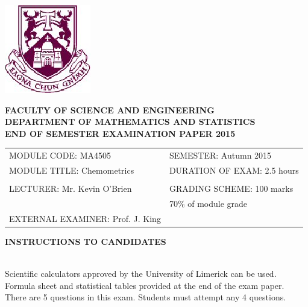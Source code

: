 \documentclass[a4paper,12pt]{article}
\begin{document}
	\begin{center}
		\includegraphics[scale=0.55]{images/shieldtransparent2}
	\end{center}
	
	\begin{center}
		\vspace{1cm}
		\large \bf {FACULTY OF SCIENCE AND ENGINEERING} \\[0.5cm]
		\normalsize DEPARTMENT OF MATHEMATICS AND STATISTICS \\[1.25cm]
		\large \bf {END OF SEMESTER EXAMINATION PAPER 2015} \\[1.5cm]
	\end{center}
	
	\begin{tabular}{ll}
		MODULE CODE: MA4505 & SEMESTER: Autumn 2015 \\[1cm]
		MODULE TITLE: Chemometrics & DURATION OF EXAM: 2.5 hours  \\
		 & \\ [1cm]
		LECTURER: Mr. Kevin O'Brien & GRADING SCHEME: 100 marks \\
		& \phantom{GRADING SCHEME:} \footnotesize {70\% of module grade} \\[1cm]
EXTERNAL EXAMINER: Prof. J. King & \\
	\end{tabular}
\vspace{0.3cm}
	\begin{center}
		{\bf INSTRUCTIONS TO CANDIDATES}
	\end{center}
	
	{\noindent \\ Scientific calculators approved by the University of Limerick can be used. \\
		Formula sheet and statistical tables provided at the end of the exam paper.\\
		There are 5 questions in this exam. Students must attempt any 4 questions.}
	\newpage
\bigskip
\end{document}
